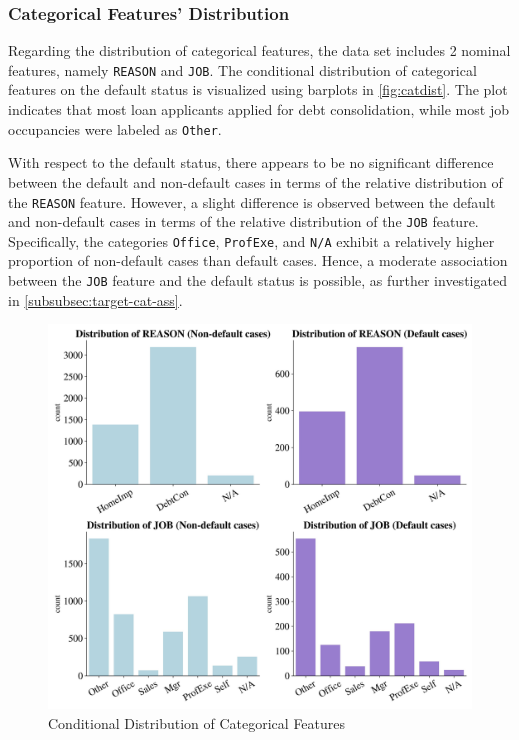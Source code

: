 \subsubsection{Categorical Features' Distribution}
\label{subsubsec:catdist}

Regarding the distribution of categorical features, the data set includes 2 nominal features, namely \texttt{REASON} and \texttt{JOB}.
The conditional distribution of categorical features on the default status is visualized using barplots in \autoref{fig:catdist}.
The plot indicates that most loan applicants applied for debt consolidation, while most job occupancies were labeled as \texttt{Other}.

With respect to the default status, there appears to be no significant difference between the default and non-default cases in terms of the relative distribution of the \texttt{REASON} feature.
However, a slight difference is observed between the default and non-default cases in terms of the relative distribution of the \texttt{JOB} feature.
Specifically, the categories \texttt{Office}, \texttt{ProfExe}, and \texttt{N/A} exhibit a relatively higher proportion of non-default cases than default cases.
Hence, a moderate association between the \texttt{JOB} feature and the default status is possible, as further investigated in \autoref{subsubsec:target-cat-ass}.


\begin{figure}[H]
\centering
\caption{Conditional Distribution of Categorical Features}\vspace{0.5em}
\label{fig:catdist}
\includegraphics[width=140mm]{Figures/Categorical_Features_Distribution.jpg}
\vspace{-1em}
\end{figure}

